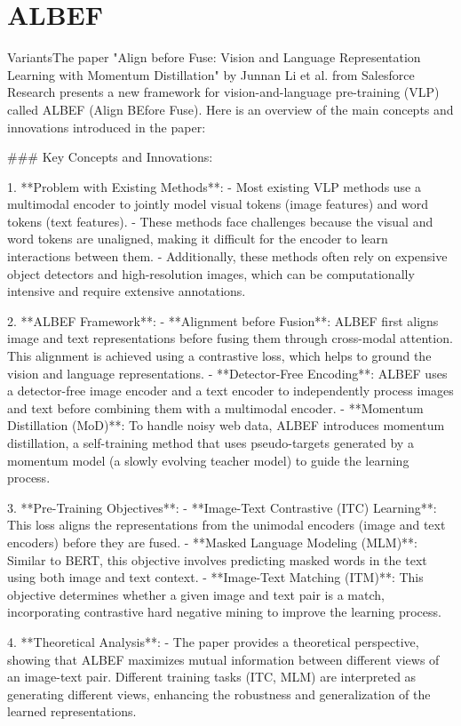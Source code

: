 \section{ALBEF}
VariantsThe paper "Align before Fuse: Vision and Language Representation Learning with Momentum Distillation" by Junnan Li et al. from Salesforce Research presents a new framework for vision-and-language pre-training (VLP) called ALBEF (Align BEfore Fuse). Here is an overview of the main concepts and innovations introduced in the paper:

### Key Concepts and Innovations:

1. **Problem with Existing Methods**:
   - Most existing VLP methods use a multimodal encoder to jointly model visual tokens (image features) and word tokens (text features).
   - These methods face challenges because the visual and word tokens are unaligned, making it difficult for the encoder to learn interactions between them.
   - Additionally, these methods often rely on expensive object detectors and high-resolution images, which can be computationally intensive and require extensive annotations.

2. **ALBEF Framework**:
   - **Alignment before Fusion**: ALBEF first aligns image and text representations before fusing them through cross-modal attention. This alignment is achieved using a contrastive loss, which helps to ground the vision and language representations.
   - **Detector-Free Encoding**: ALBEF uses a detector-free image encoder and a text encoder to independently process images and text before combining them with a multimodal encoder.
   - **Momentum Distillation (MoD)**: To handle noisy web data, ALBEF introduces momentum distillation, a self-training method that uses pseudo-targets generated by a momentum model (a slowly evolving teacher model) to guide the learning process.

3. **Pre-Training Objectives**:
   - **Image-Text Contrastive (ITC) Learning**: This loss aligns the representations from the unimodal encoders (image and text encoders) before they are fused.
   - **Masked Language Modeling (MLM)**: Similar to BERT, this objective involves predicting masked words in the text using both image and text context.
   - **Image-Text Matching (ITM)**: This objective determines whether a given image and text pair is a match, incorporating contrastive hard negative mining to improve the learning process.

4. **Theoretical Analysis**:
   - The paper provides a theoretical perspective, showing that ALBEF maximizes mutual information between different views of an image-text pair. Different training tasks (ITC, MLM) are interpreted as generating different views, enhancing the robustness and generalization of the learned representations.

